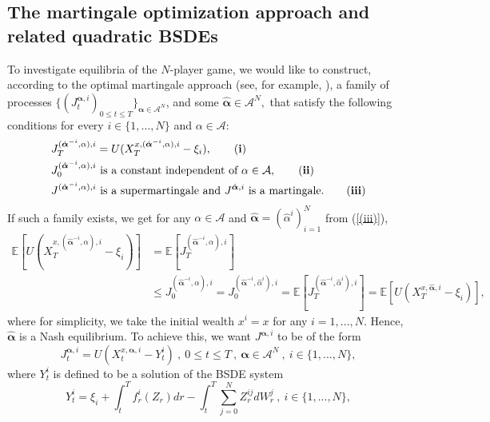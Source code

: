 \documentclass[10pt,a4paper]{article}
\newcommand{\MA}{{\mathcal{A}}}
\newcommand{\Balpha}{\boldsymbol{\alpha}}
\newcommand{\hBalpha}{\hat{\Balpha}}
\theoremstyle{plain}
\theoremstyle{definition}
\numberwithin{equation}{section}
\begin{document}

\subsection{The martingale optimization approach and related quadratic BSDEs}
\label{sec2.2}
To investigate equilibria of the $N$-player game, we would like to construct, according to the optimal martingale approach (see, for example, \cite[Section 6.6.1]{Ref4}), a family of processes $\{ (J_{t}^{\Balpha,i})_{0 \leq t \leq T} \}_{\Balpha \in \mathcal{A}^{N}}$, and some $\hBalpha \in \MA^N,$ that satisfy the following conditions for every $i \in \{1,...,N\}$ and $\alpha \in \MA$: 
\begin{align}
&J_{T}^{(\hBalpha^{-i},\alpha),i} = U(X_{T}^{x,(\hBalpha^{-i},\alpha),i}-\xi_{i}), \label{(i)} \tag{\textbf{i}} \\
&J_{0}^{(\hBalpha^{-i}, \alpha),i} \ \text{is a constant independent of} \ \alpha  \in \mathcal{A}, \label{(ii)} \tag{\textbf{ii}} \\
&J^{(\hBalpha^{-i}, \alpha),i} \ \text{is a supermartingale and }  J^{\hBalpha,i} \ \text{is a martingale.} \label{(iii)} \tag{\textbf{iii}}
\end{align}
If such a family exists, we get for any $\alpha \in \mathcal{A} $ and $\hBalpha= (\hat{\alpha}^{i})_{i=1}^N$ from (\ref{(iii)}),
\begin{equation}
\label{equ:martopt}
\begin{split}
\mathbb{E}[ U(X_{T}^{x,(\hat{\Balpha}^{-i} , \alpha ),i}-\xi_{i})] & = \mathbb{E}[J_{T}^{(\hat{\Balpha}^{-i} , \alpha ),i}]\\
& \leq J_{0}^{(\hat{\Balpha}^{-i} , \alpha ),i} = J_{0}^{(\hBalpha^{-i},\hat{\alpha}^{i}),i} = \mathbb{E}[J_{T}^{(\hBalpha^{-i},\hat{\alpha}^{i}),i}] = \mathbb{E}[U(X_{T}^{x, \hBalpha,i}-\xi_{i})],
\end{split}
\end{equation}
where for simplicity, we take the initial wealth $x^i =x$ for any $i=1,...,N.$ Hence, $\hBalpha$ is a Nash equilibrium.
To achieve this, we want $J^{\Balpha,i}$ to be of the form
\[
J_{t}^{\Balpha,i} = U(X_{t}^{x,\Balpha,i}-Y_{t}^{i}) \ , \ 0 \leq t \leq T \ , \ \Balpha \in \mathcal{A}^{N} \ , \ i \in \{1,...,N\},
\]
where $Y_{t}^{i}$ is defined to be a solution of the BSDE system
\begin{equation}
\label{equ:qBSDE}
Y_{t}^{i} = \xi_{i} + \int_{t}^{T}f_{r}^{i}(Z_{r})dr - \int_{t}^{T}\sum_{j=0}^{N}Z_{r}^{ij}dW_{r}^{j} \ , \ i \in \{1,...,N\},
\end{equation}
\end{document}
